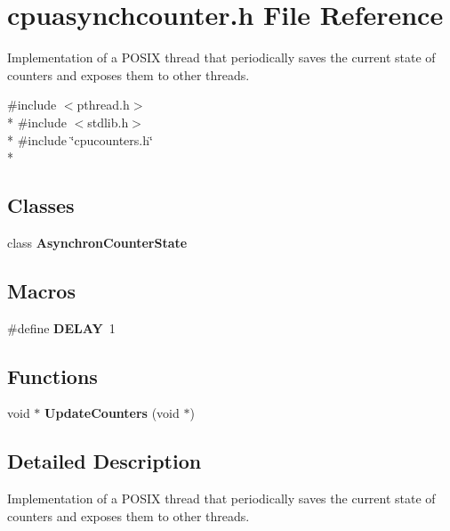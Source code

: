 \section{cpuasynchcounter.\+h File Reference}
\label{cpuasynchcounter_8h}


Implementation of a P\+O\+S\+IX thread that periodically saves the current state of counters and exposes them to other threads.  


{\ttfamily \#include $<$pthread.\+h$>$}\\*
{\ttfamily \#include $<$stdlib.\+h$>$}\\*
{\ttfamily \#include \char`\"{}cpucounters.\+h\char`\"{}}\\*
\subsection*{Classes}
\begin{DoxyCompactItemize}
\item 
class {\bf Asynchron\+Counter\+State}
\end{DoxyCompactItemize}
\subsection*{Macros}
\begin{DoxyCompactItemize}
\item 
\#define {\bfseries D\+E\+L\+AY}~1\label{cpuasynchcounter_8h_a62249e384b997229a3e2ae74ade334e2}

\end{DoxyCompactItemize}
\subsection*{Functions}
\begin{DoxyCompactItemize}
\item 
void $\ast$ {\bfseries Update\+Counters} (void $\ast$)\label{cpuasynchcounter_8h_adfa97f5f86f053c95e1c725b790a3922}

\end{DoxyCompactItemize}


\subsection{Detailed Description}
Implementation of a P\+O\+S\+IX thread that periodically saves the current state of counters and exposes them to other threads. 

